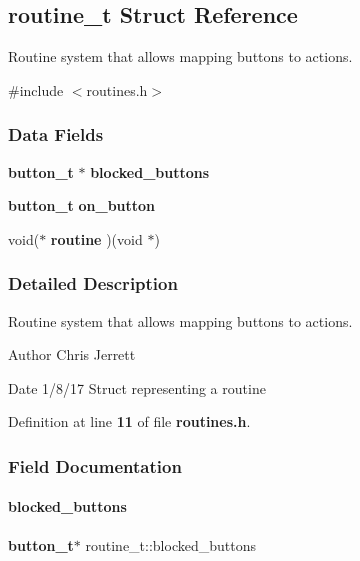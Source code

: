 \subsection{routine\+\_\+t Struct Reference}
\label{structroutine__t}


Routine system that allows mapping buttons to actions.  




{\ttfamily \#include $<$routines.\+h$>$}

\subsubsection*{Data Fields}
\begin{DoxyCompactItemize}
\item 
\textbf{ button\+\_\+t} $\ast$ \textbf{ blocked\+\_\+buttons}
\item 
\textbf{ button\+\_\+t} \textbf{ on\+\_\+button}
\item 
void($\ast$ \textbf{ routine} )(void $\ast$)
\end{DoxyCompactItemize}


\subsubsection{Detailed Description}
Routine system that allows mapping buttons to actions. 

\begin{DoxyAuthor}{Author}
Chris Jerrett 
\end{DoxyAuthor}
\begin{DoxyDate}{Date}
1/8/17 Struct representing a routine 
\end{DoxyDate}


Definition at line \textbf{ 11} of file \textbf{ routines.\+h}.



\subsubsection{Field Documentation}
\mbox{\label{structroutine__t_a8d278c682e01bd513956f9902772812a}} 
\paragraph{blocked\+\_\+buttons}
{\footnotesize\ttfamily \textbf{ button\+\_\+t}$\ast$ routine\+\_\+t\+::blocked\+\_\+buttons}



